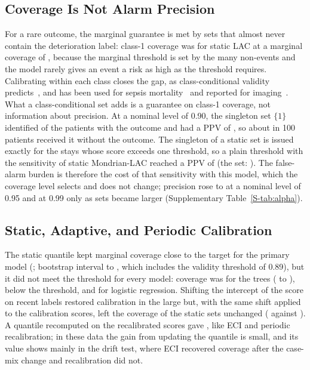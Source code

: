\subsection{Coverage Is Not Alarm Precision}

For a rare outcome, the marginal guarantee is met by
sets that almost never contain the deterioration label: class-1 coverage was \RVSetCovOneStaticLac{} for static LAC at a marginal coverage of \RVSetCovStaticLac{}, because the
marginal threshold is set by the many non-events and the model rarely gives an event a risk as high as the threshold requires.
Calibrating within each class closes the gap, as class-conditional validity predicts~\cite{vovk2003mondrian,ding2023classconditional}, and has been used for sepsis mortality~\cite{yang2024sepsisconformal} and reported for imaging~\cite{millar2026classconditionalms}. What a class-conditional set adds is a guarantee on class-1 coverage, not information about precision. At a nominal level of 0.90, the singleton
set $\{1\}$ identified \RVSetSensMondEci{} of the patients with the outcome and had a PPV of \RVSetPpvMondEci{}, so about \RVSetFaMondEci{} in 100 patients received it
without the outcome. The singleton of a static set is issued exactly for the stays whose score exceeds one threshold, so a plain threshold with the sensitivity of static Mondrian-LAC reached a PPV of \RVPrMondSame{} (the set: \RVPrMondPpv{}). The false-alarm burden is therefore the cost of that sensitivity with this model, which the coverage level selects and does not change; precision rose to \RVAFivePpvMondEci{} at a nominal level of 0.95 and \RVAOnePpvMondEci{} at 0.99 only as sets became larger (Supplementary Table~\ref{S-tab:alpha}).

\subsection{Static, Adaptive, and Periodic Calibration}

The static quantile kept marginal coverage close to the target for the primary model (\RVIntCovStatic{}; bootstrap interval \RVStaticBootHybLo{} to \RVStaticBootHybHi{}, which includes the validity threshold of 0.89), but it did not meet the threshold for every model: coverage was \RVOtherXgbStaticCov{} for the trees (\RVStaticBootXgbLo{} to \RVStaticBootXgbHi{}), below the threshold, and \RVOtherLrStaticCov{} for logistic regression. Shifting the intercept of the score on recent labels restored calibration in the large but, with the same shift applied to the calibration scores, left the coverage of the static sets unchanged (\RVIrCovOne{} against \RVIrCovOrig{}). A quantile recomputed on the recalibrated scores gave \RVIrCovTwo{}, like ECI and periodic recalibration; in these data the gain from updating the quantile is small, and its value shows mainly in the drift test, where ECI recovered coverage after the case-mix change and recalibration did not. 

